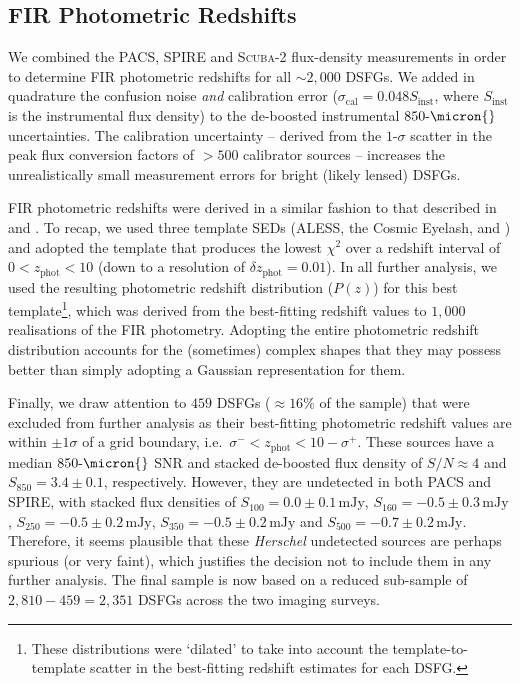 \documentclass[a4paper, fleqn, usenatbib]{mnras}
\newcommand{\herschel}{\textit{Herschel}}
\newcommand{\millijanksy}{\text{mJy}}
\newcommand{\scuba}{\mbox{\textsc{Scuba}-2}}
\newcommand{\zphot}{z_{\text{phot}}}
\begin{document}
\subsection{FIR Photometric Redshifts}

We combined the PACS, SPIRE and \scuba{} flux-density measurements in order to determine FIR photometric redshifts for all $\sim2{,}000$ DSFGs.
We added in quadrature the confusion noise \citep[$\sigma_{\text{conf}}=0.8\,\millijanksy$ ---][]{geach17} \emph{and} calibration error ($\sigma_{\text{cal}}=0.048S_{\text{inst}}$, where $S_{\text{inst}}$ is the instrumental flux density) to the de-boosted instrumental $850\text{-}\micron{}$ uncertainties.
The calibration uncertainty -- derived from the $1\text{-}\sigma$ scatter in the peak flux conversion factors of $>500$ calibrator sources \citep{dempsey13} -- increases the unrealistically small measurement errors for bright (likely lensed) DSFGs.

FIR photometric redshifts were derived in a similar fashion to that described in  and .
To recap, we used three template SEDs (ALESS, the Cosmic Eyelash, and \citet{pope08}) and adopted the template that produces the lowest $\chi^2$ over a redshift interval of $0<\zphot{}<10$ (down to a resolution of $\delta \zphot{} =0.01$).
In all further analysis, we used the resulting photometric redshift distribution ($P(z)$) for this best template\footnote{%
    These distributions were `dilated' to take into account the template-to-template scatter in the best-fitting redshift estimates for each DSFG.
}, which was derived from the best-fitting redshift values to $1{,}000$ realisations of the FIR photometry.
Adopting the entire photometric redshift distribution accounts for the (sometimes) complex shapes that they may possess better than simply adopting a Gaussian representation for them.

Finally, we draw attention to $459$ DSFGs ($\approx16\%$ of the sample) that were excluded from further analysis as their best-fitting photometric redshift values are within $\pm1\sigma$ of a grid boundary, i.e.\ $\sigma^{-}<\zphot{}<10-\sigma^{+}$.
These sources have a median $850\text{-}\micron{}$ SNR and stacked de-boosted flux density of $S/N\approx4$ and $S_{850}=3.4\pm0.1$, respectively.
However, they are undetected in both PACS and SPIRE, with stacked flux densities of $S_{100}=0.0\pm0.1\,\millijanksy{}$, $S_{160}=-0.5\pm0.3\,\millijanksy{}$, $S_{250}=-0.5\pm0.2\,\millijanksy{}$, $S_{350}=-0.5\pm0.2\,\millijanksy{}$ and $S_{500}=-0.7\pm0.2\,\millijanksy{}$. 
Therefore, it seems plausible that these \herschel{} undetected sources are perhaps spurious (or very faint), which justifies the decision not to include them in any further analysis.
The final sample is now based on a reduced sub-sample of $2{,}810-459=2{,}351$ DSFGs across the two imaging surveys.
\end{document}
